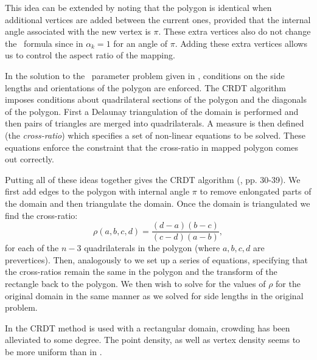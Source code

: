 This idea can be extended by noting that the polygon is identical when additional vertices are added between the current ones, provided that the internal angle associated with the new vertex is $\pi$. These extra vertices also do not change the \sch\ formula since in  $\alpha_k=1$ for an angle of $\pi$. Adding these extra vertices allows us to control the aspect ratio of the mapping.

In the solution to the \sch\ parameter problem given in , conditions on the side lengths and orientations of the polygon are enforced. The CRDT algorithm imposes conditions about quadrilateral sections of the polygon and the diagonals of the polygon. First a Delaunay triangulation of the domain is performed and then pairs of triangles are merged into quadrilaterals. A measure is then defined (the \emph{cross-ratio}) which specifies a set of non-linear equations to be solved. These equations enforce the constraint that the cross-ratio in mapped polygon comes out correctly. 

Putting all of these ideas together gives the CRDT algorithm (\cite{driscoll}, pp. 30-39). We first add edges to the polygon with internal angle $\pi$ to remove enlongated parts of the domain and then triangulate the domain. Once the domain is triangulated we find the cross-ratio:
\begin{equation}
\rho(a,b,c,d) = \frac{(d-a)(b-c)}{(c-d)(a-b)},
\end{equation}
for each of the $n-3$ quadrilaterals in the polygon (where $a,b,c,d$ are prevertices). Then, analogously to  we set up a series of equations, specifying that the cross-ratios remain the same in the polygon and the transform of the rectangle back to the polygon. We then wish to solve for the values of $\rho$ for the original domain in the same manner as we solved for side lengths in the original problem. 

In  the CRDT method is used with a rectangular domain, crowding has been alleviated to some degree. The point density, as well as vertex density seems to be more uniform than in .

